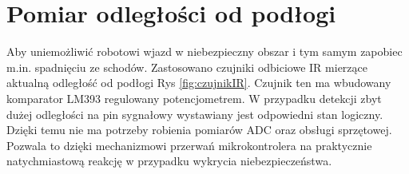	\section{Pomiar odległości od podłogi}
		Aby uniemożliwić robotowi wjazd w niebezpieczny obszar i tym samym zapobiec m.in. spadnięciu ze schodów. Zastosowano czujniki odbiciowe IR mierzące aktualną odległość od podłogi Rys \ref{fig:czujnikIR}. Czujnik ten ma wbudowany komparator LM393 regulowany potencjometrem. W przypadku detekcji zbyt dużej odległości na pin sygnałowy wystawiany jest odpowiedni stan logiczny. Dzięki temu nie ma potrzeby robienia pomiarów ADC oraz obsługi sprzętowej. Pozwala to dzięki mechanizmowi przerwań mikrokontrolera na praktycznie natychmiastową reakcję w przypadku wykrycia niebezpieczeństwa. 
		
